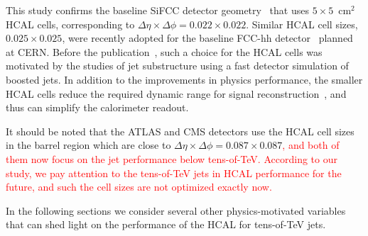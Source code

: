 This study confirms the baseline SiFCC detector geometry~\cite{Chekanov:2016ppq} that uses $5 \times 5$~cm$^2$ HCAL cells,
corresponding to $\Delta \eta \times \Delta \phi = 0.022\times0.022$.
Similar HCAL cell sizes,  $0.025\times0.025$,  were recently adopted for the baseline FCC-hh detector~\cite{fcc1,fcc2} planned at CERN.
Before the publication~\cite{Chekanov:2016ppq},   such a choice for the HCAL cells   
was motivated by the studies of jet substructure  using a fast detector simulation of boosted jets.
In addition to the improvements in physics performance, the smaller HCAL cells 
reduce the required dynamic range for 
signal reconstruction~\cite{Chekanov:2015ihl}, and thus can simplify the calorimeter readout.

It should be noted that the ATLAS and CMS detectors use the HCAL cell sizes in the barrel region which are close to 
$\Delta \eta \times \Delta \phi = 0.087\times 0.087$\textcolor{red}{, and both of them now focus on the jet performance below tens-of-TeV. According to our study, we pay attention to the tens-of-TeV jets in HCAL performance for the future, and such the cell sizes are not optimized exactly now.}

In the following sections we consider several other physics-motivated
variables that can shed light on the performance of the HCAL for tens-of-TeV jets.

